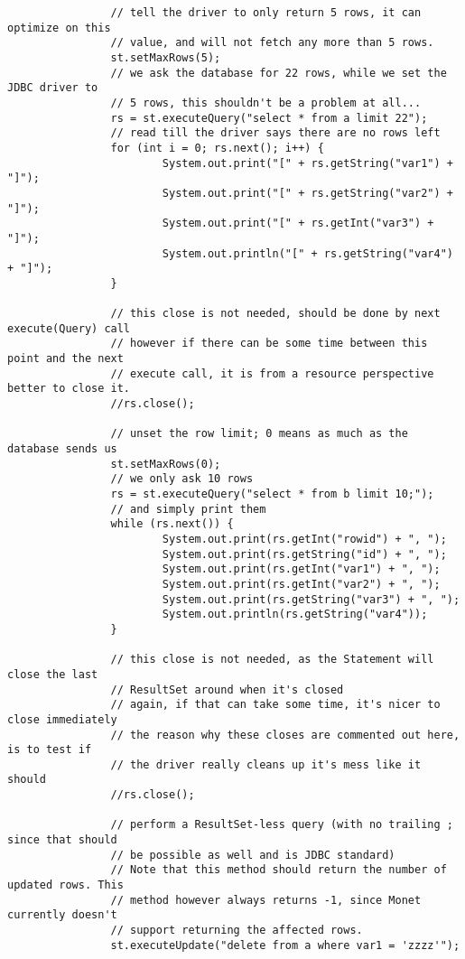\documentclass{article}
\begin{document}
\begin{verbatim}
                // tell the driver to only return 5 rows, it can optimize on this
                // value, and will not fetch any more than 5 rows.
                st.setMaxRows(5);
                // we ask the database for 22 rows, while we set the JDBC driver to
                // 5 rows, this shouldn't be a problem at all...
                rs = st.executeQuery("select * from a limit 22");
                // read till the driver says there are no rows left
                for (int i = 0; rs.next(); i++) {
                        System.out.print("[" + rs.getString("var1") + "]");
                        System.out.print("[" + rs.getString("var2") + "]");
                        System.out.print("[" + rs.getInt("var3") + "]");
                        System.out.println("[" + rs.getString("var4") + "]");
                }

                // this close is not needed, should be done by next execute(Query) call
                // however if there can be some time between this point and the next
                // execute call, it is from a resource perspective better to close it.
                //rs.close();

                // unset the row limit; 0 means as much as the database sends us
                st.setMaxRows(0);
                // we only ask 10 rows
                rs = st.executeQuery("select * from b limit 10;");
                // and simply print them
                while (rs.next()) {
                        System.out.print(rs.getInt("rowid") + ", ");
                        System.out.print(rs.getString("id") + ", ");
                        System.out.print(rs.getInt("var1") + ", ");
                        System.out.print(rs.getInt("var2") + ", ");
                        System.out.print(rs.getString("var3") + ", ");
                        System.out.println(rs.getString("var4"));
                }

                // this close is not needed, as the Statement will close the last
                // ResultSet around when it's closed
                // again, if that can take some time, it's nicer to close immediately
                // the reason why these closes are commented out here, is to test if
                // the driver really cleans up it's mess like it should
                //rs.close();

                // perform a ResultSet-less query (with no trailing ; since that should
                // be possible as well and is JDBC standard)
                // Note that this method should return the number of updated rows. This
                // method however always returns -1, since Monet currently doesn't
                // support returning the affected rows.
                st.executeUpdate("delete from a where var1 = 'zzzz'");


\end{verbatim}
\end{document}
